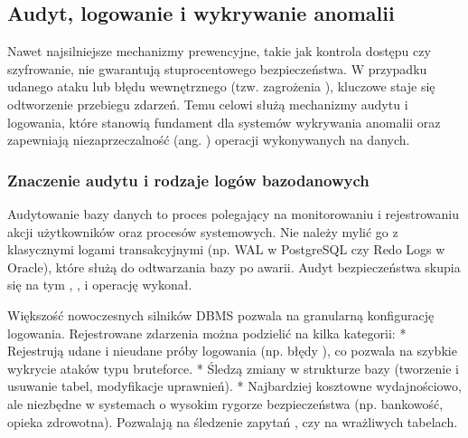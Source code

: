\documentclass[a4paper,11pt,english,openany,oneside]{sphinxmanual}
\begin{document}
\subsection{Audyt, logowanie i wykrywanie anomalii}
\label{\detokenize{rozdzial_2/rozdzial_27/rozdzial_5:audyt-logowanie-i-wykrywanie-anomalii}}\label{\detokenize{rozdzial_2/rozdzial_27/rozdzial_5::doc}}
\sphinxAtStartPar
Nawet najsilniejsze mechanizmy prewencyjne, takie jak kontrola dostępu czy szyfrowanie, nie gwarantują stuprocentowego bezpieczeństwa. W przypadku udanego ataku lub błędu wewnętrznego (tzw. zagrożenia ), kluczowe staje się odtworzenie przebiegu zdarzeń. Temu celowi służą mechanizmy audytu i logowania, które stanowią fundament dla systemów wykrywania anomalii oraz zapewniają niezaprzeczalność (ang. ) operacji wykonywanych na danych.


\subsubsection{Znaczenie audytu i rodzaje logów bazodanowych}
\label{\detokenize{rozdzial_2/rozdzial_27/rozdzial_5:znaczenie-audytu-i-rodzaje-logow-bazodanowych}}
\sphinxAtStartPar
Audytowanie bazy danych to proces polegający na monitorowaniu i rejestrowaniu akcji użytkowników oraz procesów systemowych. Nie należy mylić go z klasycznymi logami transakcyjnymi (np. WAL w PostgreSQL czy Redo Logs w Oracle), które służą do odtwarzania bazy po awarii. Audyt bezpieczeństwa skupia się na tym , ,  i  operację wykonał.

\sphinxAtStartPar
Większość nowoczesnych silników DBMS pozwala na granularną konfigurację logowania. Rejestrowane zdarzenia można podzielić na kilka kategorii:
*  Rejestrują udane i nieudane próby logowania (np. błędy ), co pozwala na szybkie wykrycie ataków typu brute\sphinxhyphen{}force.
*  Śledzą zmiany w strukturze bazy (tworzenie i usuwanie tabel, modyfikacje uprawnień).
*  Najbardziej kosztowne wydajnościowo, ale niezbędne w systemach o wysokim rygorze bezpieczeństwa (np. bankowość, opieka zdrowotna). Pozwalają na śledzenie zapytań ,  czy  na wrażliwych tabelach.
\end{document}
